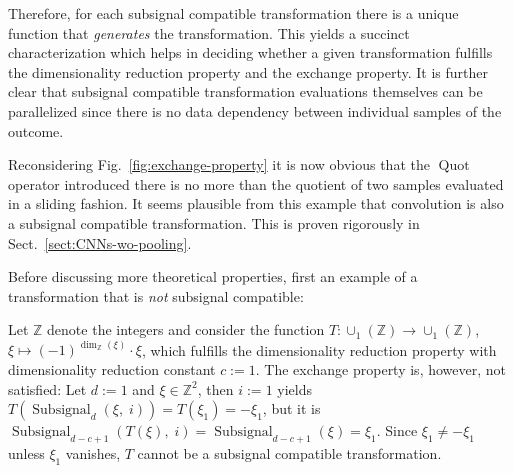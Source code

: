 \documentclass[journal]{IEEEtran}
\newcommand{\Z}{\mathbb{Z}}
\DeclareMathOperator{\Subsignal}{Subsignal}
\begin{document}
Therefore, for each subsignal compatible transformation there is a unique function that \emph{generates} the transformation.
This yields a succinct characterization which helps in deciding whether a given transformation fulfills the dimensionality reduction property and the exchange property.
It is further clear that subsignal compatible transformation evaluations themselves can be parallelized since there is no data dependency between individual samples of the outcome.

Reconsidering Fig.~\ref{fig:exchange-property} it is now obvious that the $\operatorname{Quot}$ operator introduced there is no more than the quotient of two samples evaluated in a sliding fashion.
It seems plausible from this example that convolution is also a subsignal compatible transformation.
This is proven rigorously in Sect.~\ref{sect:CNNs-wo-pooling}.

Before discussing more theoretical properties, first an example of a transformation that is \emph{not} subsignal compatible:
\begin{example}
Let $\Z$ denote the integers and consider the function $T\colon\cup_1(\Z) \to \cup_1(\Z)$, $\xi\mapsto (-1)^{\dim_{\Z}(\xi)}\cdot\xi$, which fulfills the dimensionality reduction property with dimensionality reduction constant $c := 1$.
The exchange property is, however, not satisfied:
Let $d := 1$ and $\xi\in\Z^2$, then $i := 1$ yields $T(\Subsignal_d(\xi,\;i)) = T(\xi_1) = -\xi_1$, but it is $\Subsignal_{d - c + 1}(T(\xi),\;i) = \Subsignal_{d - c + 1}(\xi) = \xi_1$.
Since $\xi_1 \neq -\xi_1$ unless $\xi_1$ vanishes, $T$ cannot be a subsignal compatible transformation.
\end{example}
\end{document}
